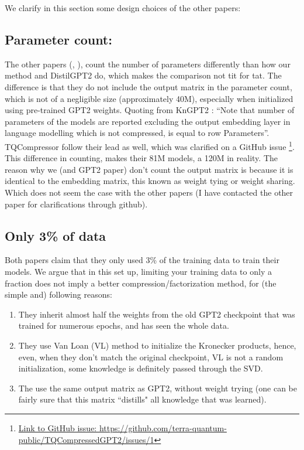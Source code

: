 \documentclass{article}
\begin{document}
{We clarify in this section some design choices of the other papers:

\subsection{Parameter count:}%
\label{sub:Parameter count:}

The other papers (\cite{tahaei2022kroneckerbert}, \cite{abronin2024tqcompressor}), count the number of parameters differently than how our method and DistilGPT2 do, which makes the comparison not tit for tat. The difference is that they do not include the output matrix in the parameter count, which is not of a negligible size (approximately 40M), especially when initialized using pre-trained GPT2 weights. Quoting from KnGPT2 \cite{tahaei2022kroneckerbert}: ``Note that number of parameters of the models are reported excluding the output embedding layer in language modelling which is not compressed, is equal to row Parameters''. TQCompressor \cite{abronin2024tqcompressor} follow their lead as well, which was clarified on a GitHub issue \footnote{\href{https://github.com/terra-quantum-public/TQCompressedGPT2/issues/1}{Link to GitHub issue: https://github.com/terra-quantum-public/TQCompressedGPT2/issues/1}}.
This difference in counting, makes their 81M models, a 120M in reality. The reason why we (and GPT2 paper) don't count the output matrix is because it is identical to the embedding matrix, this known as weight tying or weight sharing. Which does not seem the case with the other papers (I have contacted the other paper for clarifications through github).

\subsection{Only 3\% of data}%
\label{sub:Only 3\% of data}

Both papers claim that they only used 3\% of the training data to train their models. We argue that in this set up, limiting your training data to only a fraction  does not imply a better compression/factorization method, for (the simple and) following reasons:

\begin{enumerate}
	\item They inherit almost half the weights from the old GPT2 checkpoint that was trained for numerous epochs, and has seen the whole data. 
	\item They use Van Loan (VL) method to initialize the Kronecker products, hence, even, when they don't match the original checkpoint, VL is not a random initialization, some knowledge is definitely passed through the SVD. 
	\item The use the same output matrix as GPT2, without weight trying (one can be fairly sure that this matrix ``distills" all knowledge that was learned). 
\end{enumerate}

}
\end{document}
